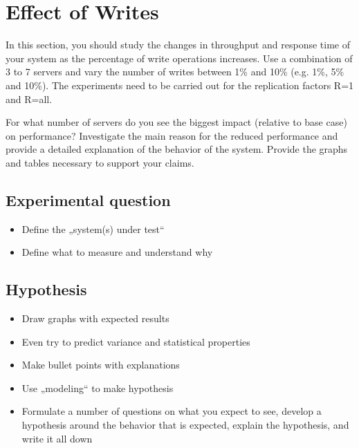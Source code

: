 \documentclass[11pt]{article}
\begin{document}
\section{Effect of Writes}

In this section, you should study the changes in throughput and response time of your system as the percentage of write operations increases. Use a combination of 3 to 7 servers and vary the number of writes between 1\% and 10\% (e.g. 1\%, 5\% and 10\%). The experiments need to be carried out for the replication factors R=1 and R=all.  

For what number of servers do you see the biggest impact (relative to base case) on performance? Investigate the main reason for the reduced performance and provide a detailed explanation of the behavior of the system. Provide the graphs and tables necessary to support your claims.


\subsection{Experimental question}
\begin{itemize}
\item Define the „system(s) under test“
\item Define what to measure and understand why
\end{itemize}

\subsection{Hypothesis}
\begin{itemize}
\item Draw graphs with expected results
\item Even try to predict variance and statistical properties
\item Make bullet points with explanations
\item Use „modeling“ to make hypothesis
\item Formulate a number of questions on what you expect to see, develop a hypothesis around the behavior that is expected, explain the hypothesis, and write it all down
\end{itemize}
\end{document}
